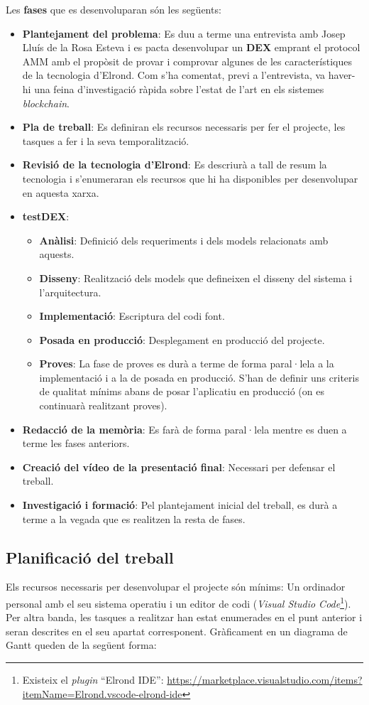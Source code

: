 \documentclass[11pt,a4paper]{article}
\begin{document}
Les \textbf{fases} que es desenvoluparan són les següents:
\begin{itemize}
    \item \textbf{Plantejament del problema}: Es duu a terme una entrevista amb Josep Lluís de la Rosa Esteva i es pacta desenvolupar un \textbf{DEX} emprant el protocol AMM amb el propòsit de provar i comprovar algunes de les característiques de la tecnologia d'Elrond. Com s'ha comentat, previ a l'entrevista, va haver-hi una feina d'investigació ràpida sobre l'estat de l'art en els sistemes \textit{blockchain}.
    \item \textbf{Pla de treball}: Es definiran els recursos necessaris per fer el projecte, les tasques a fer i la seva temporalització.
    \item \textbf{Revisió de la tecnologia d'Elrond}: Es descriurà a tall de resum la tecnologia i s'enumeraran els recursos que hi ha disponibles per desenvolupar en aquesta xarxa.
    \item \textbf{testDEX}:
    \begin{itemize}
    	\item \textbf{Anàlisi}: Definició dels requeriments i dels models relacionats amb aquests. 
    	\item \textbf{Disseny}: Realització dels models que defineixen el disseny del sistema i l'arquitectura.
    	\item \textbf{Implementació}: Escriptura del codi font.
    	\item \textbf{Posada en producció}: Desplegament en producció del projecte.
    	\item \textbf{Proves}: La fase de proves es durà a terme de forma paral·lela a la implementació i a la de posada en producció. S'han de definir uns criteris de qualitat mínims abans de posar l'aplicatiu en producció (on es continuarà realitzant proves).
    \end{itemize}
    \item \textbf{Redacció de la memòria}: Es farà de forma paral·lela mentre es duen a terme les fases anteriors.
    \item \textbf{Creació del vídeo de la presentació final}: Necessari per defensar el treball.
    \item \textbf{Investigació i formació}: Pel plantejament inicial del treball, es durà a terme a la vegada que es realitzen la resta de fases.
\end{itemize}

\subsection{Planificació del treball}
Els recursos necessaris per desenvolupar el projecte són mínims: Un ordinador personal amb el seu sistema operatiu i un editor de codi (\textit{Visual Studio Code}\footnote{Existeix el \textit{plugin} ``Elrond IDE'': \url{https://marketplace.visualstudio.com/items?itemName=Elrond.vscode-elrond-ide}}). Per altra banda, les tasques a realitzar han estat enumerades en el punt anterior i seran descrites en el seu apartat corresponent. Gràficament en un diagrama de Gantt queden de la següent forma:
\end{document}
